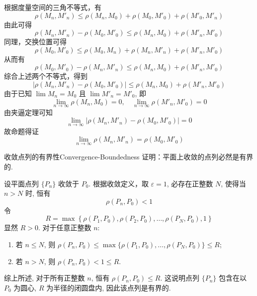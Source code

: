 \begin{myproof}
    根据度量空间的三角不等式，有
    \begin{equation}
        \rho(M_n, M'_n) \le \rho(M_n, M_0) + \rho(M_0, M'_0) + \rho(M'_0, M'_n)
    \end{equation}
    由此可得
    \begin{equation}
        \rho(M_n, M'_n) - \rho(M_0, M'_0) \le \rho(M_n, M_0) + \rho(M'_n, M'_0)
    \end{equation}
    同理，交换位置可得
    \begin{equation}
        \rho(M_0, M'_0) \le \rho(M_0, M_n) + \rho(M_n, M'_n) + \rho(M'_n, M'_0)
    \end{equation}
    从而有
    \begin{equation}
        \rho(M_0, M'_0) - \rho(M_n, M'_n) \le \rho(M_n, M_0) + \rho(M'_n, M'_0)
    \end{equation}
    综合上述两个不等式，得到
    \begin{equation}
        |\rho(M_n, M'_n) - \rho(M_0, M'_0)| \le \rho(M_n, M_0) + \rho(M'_n, M'_0)
    \end{equation}
    由于已知 $\lim M_n = M_0$ 且 $\lim M'_n = M'_0$, 即
    \begin{equation}
        \lim_{n \to \infty} \rho(M_n, M_0) = 0, \quad \lim_{n \to \infty} \rho(M'_n, M'_0) = 0
    \end{equation}
    由夹逼定理可知
    \begin{equation}
        \lim_{n \to \infty} |\rho(M_n, M'_n) - \rho(M_0, M'_0)| = 0
    \end{equation}
    故命题得证
    \begin{equation}
        \lim_{n \to \infty} \rho(M_n, M'_n) = \rho(M_0, M'_0)
    \end{equation}
\end{myproof}


\begin{problem}{收敛点列的有界性}{Convergence-Boundedness}
    证明：平面上收敛的点列必然是有界的.
\end{problem}

\begin{myproof}
    设平面点列 $\{P_n\}$ 收敛于 $P_0$.
    根据收敛定义，取 $\varepsilon = 1$, 必存在正整数 $N$, 使得当 $n > N$ 时, 恒有
    \begin{equation}
        \rho(P_n, P_0) < 1
    \end{equation}
    令
    \begin{equation}
        R = \max \left\{ \rho(P_1, P_0), \rho(P_2, P_0), \dots, \rho(P_N, P_0), 1 \right\}
    \end{equation}
    显然 $R > 0$. 对于任意正整数 $n$:
    \begin{enumerate}
        \item 若 $n \le N$, 则 $\rho(P_n, P_0) \le \max \{ \rho(P_1, P_0), \dots, \rho(P_N, P_0) \} \le R$;
        \item 若 $n > N$, 则 $\rho(P_n, P_0) < 1 \le R$.
    \end{enumerate}
    综上所述, 对于所有正整数 $n$, 恒有 $\rho(P_n, P_0) \le R$.
    这说明点列 $\{P_n\}$ 包含在以 $P_0$ 为圆心, $R$ 为半径的闭圆盘内, 因此该点列是有界的.
\end{myproof}


